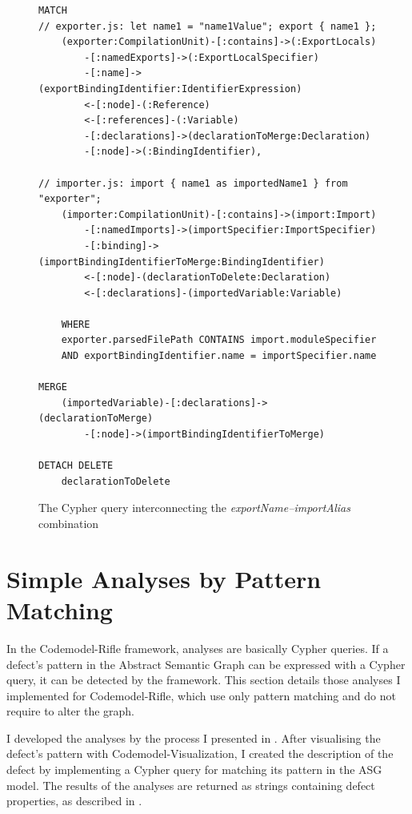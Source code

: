 \newpage
\vspace*{8.35em}
\begin{figure}[!h]
	\begin{lstlisting}[language=Cypher]
MATCH
// exporter.js: let name1 = "name1Value"; export { name1 };
    (exporter:CompilationUnit)-[:contains]->(:ExportLocals)
        -[:namedExports]->(:ExportLocalSpecifier)
        -[:name]->(exportBindingIdentifier:IdentifierExpression)
        <-[:node]-(:Reference)
        <-[:references]-(:Variable)
        -[:declarations]->(declarationToMerge:Declaration)
        -[:node]->(:BindingIdentifier),

// importer.js: import { name1 as importedName1 } from "exporter";
    (importer:CompilationUnit)-[:contains]->(import:Import)
        -[:namedImports]->(importSpecifier:ImportSpecifier)
        -[:binding]->(importBindingIdentifierToMerge:BindingIdentifier)
        <-[:node]-(declarationToDelete:Declaration)
        <-[:declarations]-(importedVariable:Variable)

    WHERE
    exporter.parsedFilePath CONTAINS import.moduleSpecifier
    AND exportBindingIdentifier.name = importSpecifier.name

MERGE
    (importedVariable)-[:declarations]->(declarationToMerge)
        -[:node]->(importBindingIdentifierToMerge)

DETACH DELETE
    declarationToDelete
	\end{lstlisting}
  \caption{The Cypher query interconnecting the \emph{exportName–importAlias} combination}
  \label{fig:export-import-example-cypher-source}
\end{figure}


\newpage
\section{Simple Analyses by Pattern Matching}

In the Codemodel-Rifle framework, analyses are basically Cypher queries. If a defect's pattern in the Abstract Semantic Graph can be expressed with a Cypher query, it can be detected by the framework. This section details those analyses I implemented for Codemodel-Rifle, which use only pattern matching and do not require to alter the graph.

I developed the analyses by the process I presented in . After visualising the defect's pattern with Codemodel-Visualization, I created the description of the defect by implementing a Cypher query for matching its pattern in the ASG model. The results of the analyses are returned as strings containing defect properties, as described in .


